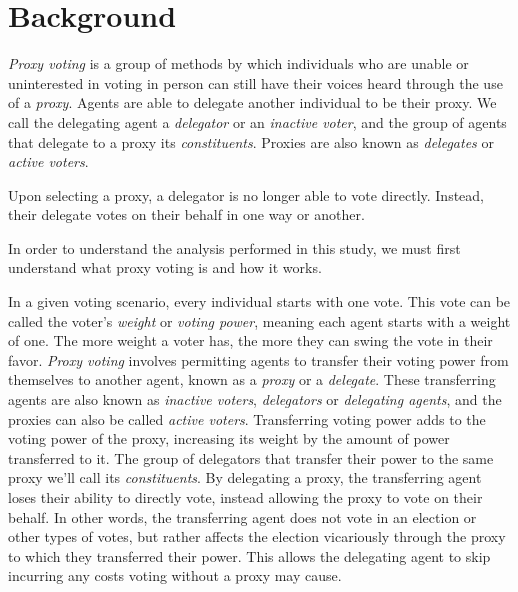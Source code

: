 \section{Background}\label{sec:background}  %
\textit{Proxy voting} is a group of methods by which individuals who are unable or
uninterested in voting in person can still have their voices heard through the use of
a \textit{proxy}.
Agents are able to delegate another individual to be their proxy.
We call the delegating agent a \textit{delegator} or an \textit{inactive voter}, and
the group of agents that delegate to a proxy its \textit{constituents}.
Proxies are also known as \textit{delegates} or \textit{active voters}.

Upon selecting a proxy, a delegator is no longer able to vote directly.
Instead, their delegate votes on their behalf in one way or another.










In order to understand the analysis performed in this study, we must first understand
what proxy voting is and how it works.

In a given voting scenario, every individual starts with one vote.
This vote can be called the voter's \textit{weight} or \textit{voting power}, meaning
each agent starts with a weight of one.
The more weight a voter has, the more they can swing the vote in their favor.
\textit{Proxy voting} involves permitting agents to transfer their voting power
from themselves to another agent, known as a \textit{proxy} or a \textit{delegate}.
These transferring agents are also known as \textit{inactive voters},
\textit{delegators} or \textit{delegating agents}, and the proxies can also be called
\textit{active voters}.
Transferring voting power adds to the voting power of the proxy, increasing its
weight by the amount of power transferred to it.
The group of delegators that transfer their power to the same proxy we'll call its
\textit{constituents}.
By delegating a proxy, the transferring agent loses their ability to directly vote,
instead allowing the proxy to vote on their behalf.
In other words, the transferring agent does not vote in an election or other types of
votes, but rather affects the election vicariously through the proxy to which they
transferred their power.
This allows the delegating agent to skip incurring any costs voting without a proxy
may cause.

